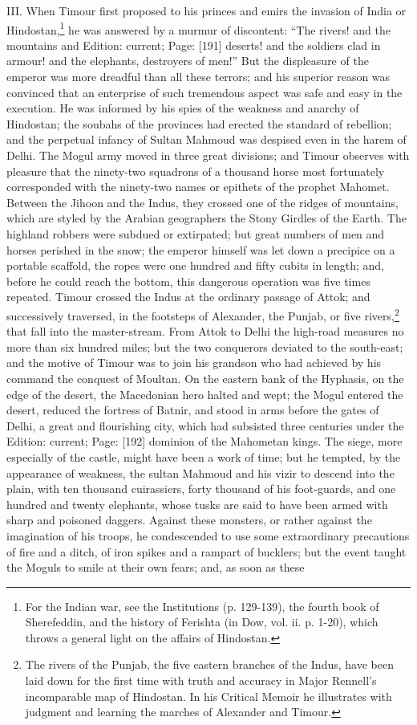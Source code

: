 III. When Timour first proposed to his princes and emirs the invasion of India or Hindostan,\footnote{For the Indian war, see the Institutions (p. 129-139), the fourth book of Sherefeddin, and the history of Ferishta (in Dow, vol. ii. p. 1-20), which throws a general light on the affairs of Hindostan.} he was answered by a murmur of discontent: \texthebrew{“}The rivers! and the mountains and Edition: current; Page: [191] deserts! and the soldiers clad in armour! and the elephants, destroyers of men!\texthebrew{}” But the displeasure of the emperor was more dreadful than all these terrors; and his superior reason was convinced that an enterprise of such tremendous aspect was safe and easy in the execution. He was informed by his spies of the weakness and anarchy of Hindostan; the soubahs of the provinces had erected the standard of rebellion; and the perpetual infancy of Sultan Mahmoud was despised even in the harem of Delhi. The Mogul army moved in three great divisions; and Timour observes with pleasure that the ninety-two squadrons of a thousand horse most fortunately corresponded with the ninety-two names or epithets of the prophet Mahomet. Between the Jihoon and the Indus, they crossed one of the ridges of mountains, which are styled by the Arabian geographers the Stony Girdles of the Earth. The highland robbers were subdued or extirpated; but great numbers of men and horses perished in the snow; the emperor himself was let down a precipice on a portable scaffold, the ropes were one hundred and fifty cubits in length; and, before he could reach the bottom, this dangerous operation was five times repeated. Timour crossed the Indus at the ordinary passage of Attok; and successively traversed, in the footsteps of Alexander, the Punjab, or five rivers,\footnote{The rivers of the Punjab, the five eastern branches of the Indus, have been laid down for the first time with truth and accuracy in Major Rennell\texthebrew{}’s incomparable map of Hindostan. In his Critical Memoir he illustrates with judgment and learning the marches of Alexander and Timour.} that fall into the master-stream. From Attok to Delhi the high-road measures no more than six hundred miles; but the two conquerors deviated to the south-east; and the motive of Timour was to join his grandson who had achieved by his command the conquest of Moultan. On the eastern bank of the Hyphasis, on the edge of the desert, the Macedonian hero halted and wept; the Mogul entered the desert, reduced the fortress of Batnir, and stood in arms before the gates of Delhi, a great and flourishing city, which had subsisted three centuries under the Edition: current; Page: [192] dominion of the Mahometan kings. The siege, more especially of the castle, might have been a work of time; but he tempted, by the appearance of weakness, the sultan Mahmoud and his vizir to descend into the plain, with ten thousand cuirassiers, forty thousand of his foot-guards, and one hundred and twenty elephants, whose tusks are said to have been armed with sharp and poisoned daggers. Against these monsters, or rather against the imagination of his troops, he condescended to use some extraordinary precautions of fire and a ditch, of iron spikes and a rampart of bucklers; but the event taught the Moguls to smile at their own fears; and, as soon as these 